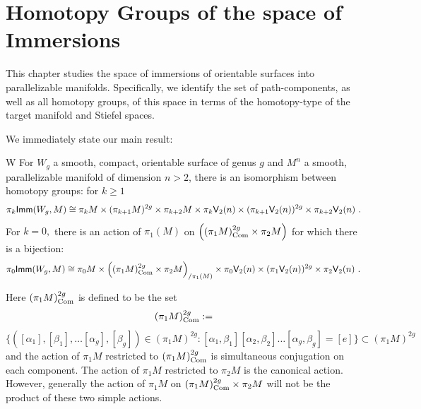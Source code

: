 \chapter{Homotopy Groups of the space of Immersions} \label{CH:H}



This chapter studies the space of immersions of orientable surfaces into parallelizable manifolds.
Specifically, we identify the set of path-components, as well as all homotopy groups, of this space in terms of the homotopy-type of the target manifold and Stiefel spaces. 


We immediately state our main result: 
\begin{mythm}{W} \label{mainhomthm}
For $W_{g}$ a smooth, compact, orientable surface of genus $g$ and $M^{n}$ a smooth, parallelizable manifold of dimension $n > 2$, 
there is an isomorphism between homotopy groups: for $k \geq 1$
\[
\pi_{k}{\sf Imm}(W_{g}, M) \cong 
\pi_{k}M \times (\pi_{k + 1}M)^{2g} \times \pi_{k + 2}M \times 
\pi_{k}\mathsf V_{2}(n) \times (\pi_{k + 1}\mathsf V_{2}(n))^{2g} \times \pi_{k + 2}\mathsf V_{2}(n)~.
\]
For $k = 0,$ there is an action of $\pi_1(M)$ on $\Bigl((\pi_{1}M)_{\rm Com}^{2g} \times \pi_{2}M \Bigr)$
for which there is a bijection:
\[
\pi_{0}{\sf Imm}(W_{g}, M) \cong 
\pi_{0}M \times \Bigl((\pi_{1}M)_{\rm Com}^{2g} \times \pi_{2}M \Bigr)_{/\pi_1(M)}
\times 
\pi_{0}\mathsf V_{2}(n) \times (\pi_{1}\mathsf V_{2}(n))^{2g} \times \pi_{2}\mathsf V_{2}(n)~.
\]
\end{mythm}

\begin{remark}
Here $(\pi_{1}M)_{\rm Com}^{2g}$  is defined to be the set
\[
(\pi_{1}M)^{2g}_{\rm Com} :=
\]
\[ \Big\{ \left([\alpha_{1}], [\beta_{1}], \hdots [\alpha_{g}], [\beta_{g}]\right) \in (\pi_{1}M)^{2g} : [\alpha_{1}, \beta_{1}][\alpha_{2}, \beta_{2}]\hdots[\alpha_{g}, \beta_{g}] = [e] \Big\} \subset (\pi_{1}M)^{2g}
\]
and the action of $\pi_{1}M$ restricted to $(\pi_{1}M)_{\rm Com}^{2g}$ is simultaneous conjugation on each component. The action of $\pi_{1}M$ restricted to $\pi_{2}M$ is the canonical action. However, generally the action of $\pi_{1}M$ on $(\pi_{1}M)_{\rm Com}^{2g} \times \pi_{2}M$ will not be the product of these two simple actions.
\end{remark}

